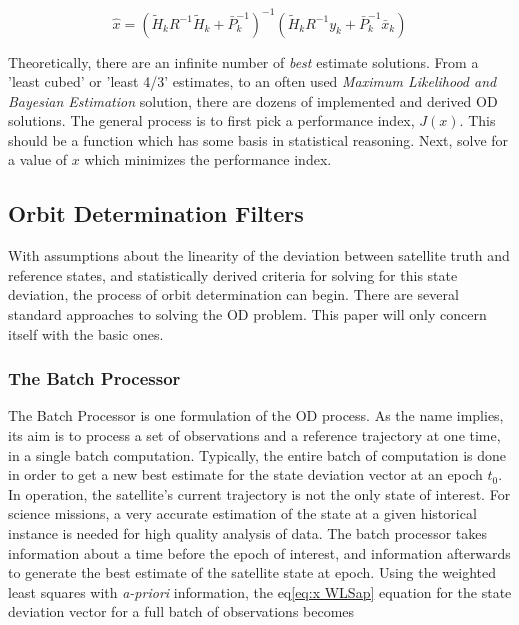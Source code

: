 \documentclass[12pt,a4paper,oneside]{article}
\numberwithin{equation}{section}   		%
\begin{document}
\begin{equation}
	\hat{x} = (\tilde{H}_k R^{-1} \tilde{H}_k + \bar{P}_k^{-1})^{-1}   (\tilde{H}_k R^{-1} y_k + \bar{P}_k^{-1} \bar{x}_k)
	\label{eq:x MinVarap}
\end{equation}

Theoretically, there are an infinite number of \emph{best} estimate solutions. From a 'least cubed' or 'least 4/3' estimates, to an often used \emph{Maximum Likelihood and Bayesian Estimation} solution, there are dozens of implemented and derived OD solutions. The general process is to first pick a performance index, $J(x)$. This should be a function which has some basis in statistical reasoning. Next, solve for a value of $x$ which minimizes the performance index. 




\subsection{Orbit Determination Filters} 
\label{sec:Filters}
With assumptions about the linearity of the deviation between satellite truth and reference states, and statistically derived criteria for solving for this state deviation, the process of orbit determination can begin. There are several standard approaches to solving the OD problem. This paper will only concern itself with the basic ones.  


\subsubsection{The Batch Processor}
\label{sec:Batch Processor}
The Batch Processor is one formulation of the OD process. As the name implies, its aim is to process a set of observations and a reference trajectory at one time, in a single batch computation. Typically, the entire batch of computation is done in order to get a new best estimate for the state deviation vector at an epoch $t_0$. In operation, the satellite's current trajectory is not the only state of interest. For science missions, a very accurate estimation of the state at a given historical instance is needed for high quality analysis of data. The batch processor takes information about a time before the epoch of interest, and information afterwards to generate the best estimate of the satellite state at epoch. 
Using the weighted least squares with \emph{a-priori} information, the eq\eqref{eq:x WLSap} equation for the state deviation vector for a full batch of observations becomes
\end{document}
